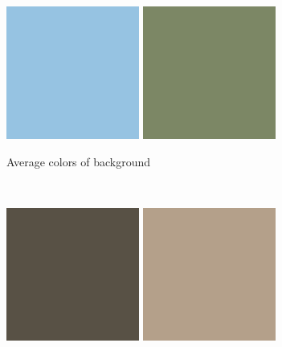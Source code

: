 \documentclass[a4paper]{article}
\begin{document}
\begin{figure}[ht]
	
	\vspace{2mm}
	\begin{subfigure}[h]{0.48\textwidth}
	\centering
	\includegraphics[width=0.48\textwidth]{imgs/backgroundMean1.png}
	\includegraphics[width=0.48\textwidth]{imgs/backgroundMean2.png}
	\caption*{Average colors of background}
	\end{subfigure}
	~
    	\vspace{2mm}
	\begin{subfigure}[h]{0.48\textwidth}
	\centering
	\includegraphics[width=0.48\textwidth]{imgs/foregroundMean1.png}
	\includegraphics[width=0.48\textwidth]{imgs/foregroundMean2.png}

\end{subfigure}
\end{figure}
\end{document}
